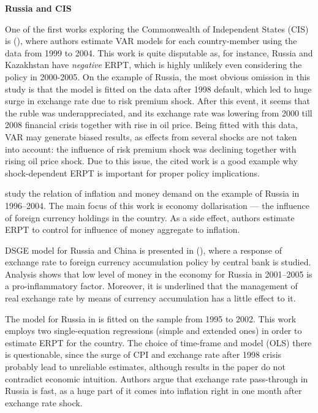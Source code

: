 \documentclass[12pt, a4paper]{extarticle}
\begin{document}
\begin{center}
	\textbf{Russia and CIS}
\end{center}

One of the first works exploring the Commonwealth of Independent States (CIS) is (\cite{Korhonen2006}), where authors estimate VAR models for each country-member using the data from 1999 to 2004. This work is quite disputable as, for instance, Russia and Kazakhstan have \textit{negative} ERPT, which is highly unlikely even considering the policy in 2000-2005. On the example of Russia, the most obvious omission in this study is that the model is fitted on the data after 1998 default, which led to huge surge in exchange rate due to risk premium shock. After this event, it seems that the ruble was underappreciated, and its exchange rate was lowering from 2000 till 2008 financial crisis together with rise in oil price. Being fitted with this data, VAR may generate biased results, as effects from several shocks are not taken into account: the influence of risk premium shock was declining together with rising oil price shock. Due to this issue, the cited work is a good example why shock-dependent ERPT is important for proper policy implications.

\textcite{Oomes2005} study the relation of inflation and money demand on the example of Russia in 1996--2004. The main focus of this work is economy dollarisation --- the influence of foreign currency holdings in the country. As a side effect, authors estimate ERPT to control for influence of money aggregate to inflation. 

DSGE model for Russia and China is presented in (\cite{Sosunov2006}), where a response of exchange rate to foreign currency accumulation policy by central bank is studied. Analysis shows that low level of money in the economy for Russia in 2001--2005 is a pro-inflammatory factor. Moreover, it is underlined that the management of real exchange rate by means of currency accumulation has a little effect to it.

The model for Russia in \cite{Dobrynskaya2008} is fitted on the sample from 1995 to 2002. This work employs two single-equation regressions (simple and extended ones) in order to estimate ERPT for the country. The choice of time-frame and model (OLS) there is questionable, since the surge of CPI and exchange rate after 1998 crisis probably lead to unreliable estimates, although results in the paper do not contradict economic intuition. Authors argue that exchange rate pass-through in Russia is fast, as a huge part of it comes into inflation right in one month after exchange rate shock.
\end{document}
